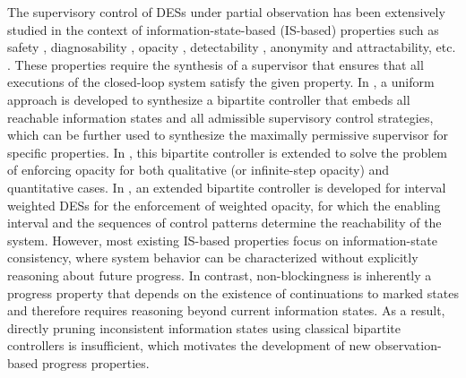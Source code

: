 \documentclass[final,5p,times,twocolumn,authoryear]{elsarticle}
\begin{document}
The supervisory control of DESs under partial observation has been extensively studied in the context of information-state-based (IS-based) properties such as safety \cite{ma2022resilient}, diagnosability \cite{li2025supervisory, hu2023asynchronous}, opacity \cite{lafortune2018history, zheng2026enforcement},
detectability \cite{shu2013enforcing}, anonymity and attractability, etc. \cite{yin2024formal, basile2022supervisory}.
These properties require the synthesis of a supervisor that ensures that all executions of the closed-loop system satisfy the given property.
%
In \cite{yin2016uniform}, a uniform approach is developed to synthesize a bipartite controller that embeds all reachable information states and all admissible supervisory control strategies, which can be further used to synthesize the maximally permissive supervisor for specific properties.
In \cite{xie2023optimal}, this bipartite controller is extended to solve the problem of enforcing opacity for both qualitative (or infinite-step opacity) and quantitative cases.
In \cite{zheng2026enforcement}, an extended bipartite controller is developed for interval weighted DESs for the enforcement of weighted opacity, for which the enabling interval and the sequences of control patterns determine the reachability of the system.
%
However, most existing IS-based properties focus on information-state consistency, where system behavior can be characterized without explicitly reasoning about future progress. 
In contrast, non-blockingness is inherently a progress property that depends on the existence of continuations to marked states and therefore requires reasoning beyond current information states. 
As a result, directly pruning inconsistent information states using classical bipartite controllers is insufficient, which motivates the development of new observation-based progress properties.
\end{document}
